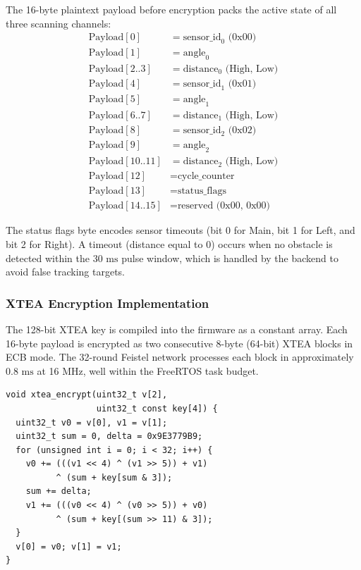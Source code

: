 \documentclass[conference]{IEEEtran}
\begin{document}
The 16-byte plaintext payload before encryption packs the active state of all three scanning channels:
\begin{align*}
    \text{Payload}[0] &= \text{sensor\_id}_0 \text{ (0x00)} \\
    \text{Payload}[1] &= \text{angle}_0 \\
    \text{Payload}[2..3] &= \text{distance}_0 \text{ (High, Low)} \\
    \text{Payload}[4] &= \text{sensor\_id}_1 \text{ (0x01)} \\
    \text{Payload}[5] &= \text{angle}_1 \\
    \text{Payload}[6..7] &= \text{distance}_1 \text{ (High, Low)} \\
    \text{Payload}[8] &= \text{sensor\_id}_2 \text{ (0x02)} \\
    \text{Payload}[9] &= \text{angle}_2 \\
    \text{Payload}[10..11] &= \text{distance}_2 \text{ (High, Low)} \\
    \text{Payload}[12] &= \text{cycle\_counter} \\
    \text{Payload}[13] &= \text{status\_flags} \\
    \text{Payload}[14..15] &= \text{reserved (0x00, 0x00)}
\end{align*}

The status flags byte encodes sensor timeouts (bit 0 for Main, bit 1 for Left, and bit 2 for Right). A timeout (distance equal to 0) occurs when no obstacle is detected within the $30\text{ ms}$ pulse window, which is handled by the backend to avoid false tracking targets.

\subsubsection{XTEA Encryption Implementation}
The 128-bit XTEA key is compiled into the firmware as a constant array. Each 16-byte payload is encrypted as two consecutive 8-byte (64-bit) XTEA blocks in ECB mode. The 32-round Feistel network processes each block in approximately $0.8\text{ ms}$ at 16 MHz, well within the FreeRTOS task budget.

\begin{lstlisting}[style=cppstyle, caption={XTEA encryption routine implemented on the ATmega328P.}, label={lst:xtea}]
void xtea_encrypt(uint32_t v[2],
                  uint32_t const key[4]) {
  uint32_t v0 = v[0], v1 = v[1];
  uint32_t sum = 0, delta = 0x9E3779B9;
  for (unsigned int i = 0; i < 32; i++) {
    v0 += (((v1 << 4) ^ (v1 >> 5)) + v1)
          ^ (sum + key[sum & 3]);
    sum += delta;
    v1 += (((v0 << 4) ^ (v0 >> 5)) + v0)
          ^ (sum + key[(sum >> 11) & 3]);
  }
  v[0] = v0; v[1] = v1;
}
\end{lstlisting}
\end{document}
